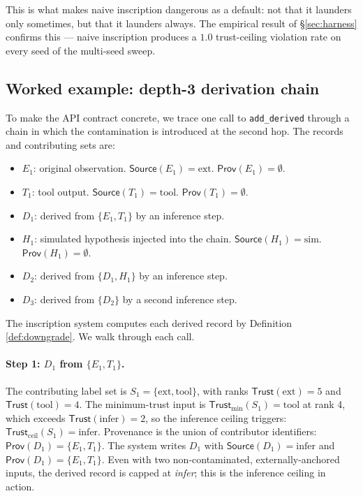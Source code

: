 \documentclass[11pt]{article}
\newcommand{\Source}{\mathsf{Source}}
\newcommand{\Trust}{\mathsf{Trust}}
\newcommand{\Prov}{\mathsf{Prov}}
\newcommand{\ext}{\ensuremath{\mathrm{ext}}}
\newcommand{\tool}{\ensuremath{\mathrm{tool}}}
\newcommand{\infer}{\ensuremath{\mathrm{infer}}}
\newcommand{\simsrc}{\ensuremath{\mathrm{sim}}}
\begin{document}
This is what makes naive inscription dangerous as a default: not that it launders only sometimes, but that it launders always. The empirical result of \S\ref{sec:harness} confirms this --- naive inscription produces a $1.0$ trust-ceiling violation rate on every seed of the multi-seed sweep.

\subsection{Worked example: depth-3 derivation chain}
\label{sec:worked-example}

To make the API contract concrete, we trace one call to \texttt{add\_derived} through a chain in which the contamination is introduced at the second hop. The records and contributing sets are:
\begin{itemize}
\item $E_1$: original observation. $\Source(E_1) = \ext$. $\Prov(E_1) = \emptyset$.
\item $T_1$: tool output. $\Source(T_1) = \tool$. $\Prov(T_1) = \emptyset$.
\item $D_1$: derived from $\{E_1, T_1\}$ by an inference step.
\item $H_1$: simulated hypothesis injected into the chain. $\Source(H_1) = \simsrc$. $\Prov(H_1) = \emptyset$.
\item $D_2$: derived from $\{D_1, H_1\}$ by an inference step.
\item $D_3$: derived from $\{D_2\}$ by a second inference step.
\end{itemize}

The inscription system computes each derived record by Definition \ref{def:downgrade}. We walk through each call.

\paragraph{Step 1: $D_1$ from $\{E_1, T_1\}$.}
The contributing label set is $S_1 = \{\ext, \tool\}$, with ranks $\Trust(\ext) = 5$ and $\Trust(\tool) = 4$. The minimum-trust input is $\Trust_{\min}(S_1) = \tool$ at rank 4, which exceeds $\Trust(\infer) = 2$, so the inference ceiling triggers: $\Trust_{\text{ceil}}(S_1) = \infer$. Provenance is the union of contributor identifiers: $\Prov(D_1) = \{E_1, T_1\}$. The system writes $D_1$ with $\Source(D_1) = \infer$ and $\Prov(D_1) = \{E_1, T_1\}$. Even with two non-contaminated, externally-anchored inputs, the derived record is capped at \emph{infer}; this is the inference ceiling in action.
\end{document}
